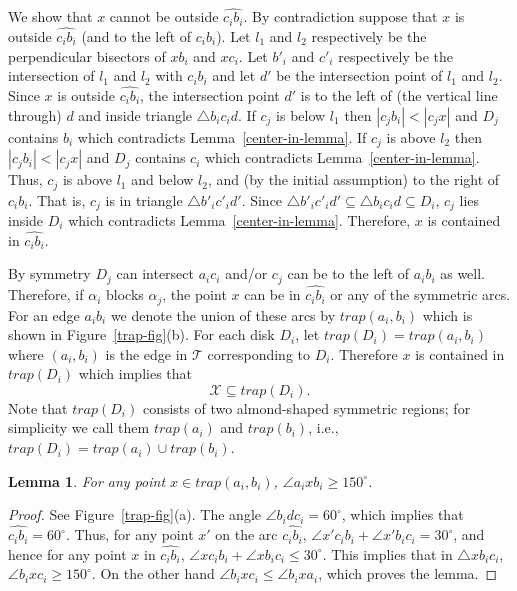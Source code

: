 \documentclass[11pt,a4paper]{article}
\newtheorem{lemma}{Lemma}
\begin{document}
We show that $x$ cannot be outside $\widehat{c_ib_i}$. By contradiction suppose that $x$ is outside $\widehat{c_ib_i}$ (and to the left of $c_ib_i$). Let $l_1$ and $l_2$ respectively be the perpendicular bisectors of $xb_i$ and $xc_i$. Let $b'_i$ and $c'_i$ respectively be the intersection of $l_1$ and $l_2$ with $c_ib_i$ and let $d'$ be the intersection point of $l_1$ and $l_2$. Since $x$ is outside $\widehat{c_ib_i}$, the intersection point $d'$ is to the left of (the vertical line through) $d$ and inside triangle $\bigtriangleup b_ic_id$. If $c_j$ is below $l_1$ then $|c_jb_i|<|c_jx|$ and $D_j$ contains $b_i$ which contradicts Lemma~\ref{center-in-lemma}. If $c_j$ is above $l_2$ then $|c_jb_i|<|c_jx|$ and $D_j$ contains $c_i$ which contradicts Lemma~\ref{center-in-lemma}. Thus, $c_j$ is above $l_1$ and below $l_2$, and (by the initial assumption) to the right of $c_ib_i$. That is, $c_j$ is in triangle $\bigtriangleup b'_ic'_id'$. Since $\bigtriangleup b'_ic'_id'\subseteq \bigtriangleup b_ic_id\subseteq D_i$, $c_j$ lies inside $D_i$ which contradicts Lemma~\ref{center-in-lemma}. Therefore, $x$ is contained in $\widehat{c_ib_i}$. 

By symmetry $D_j$ can intersect $a_ic_i$ and/or $c_j$ can be to the left of $a_ib_i$ as well. Therefore, if $\alpha_i$ blocks $\alpha_j$, the point $x$ can be in $\widehat{c_ib_i}$ or any of the symmetric arcs. For an edge $a_ib_i$ we denote the union of these arcs by $trap(a_i,b_i)$ which is shown in Figure~\ref{trap-fig}(b). For each disk $D_i$, let $trap(D_i)= trap(a_i,b_i)$ where $(a_i, b_i)$ is the edge in $\mathcal{T}$ corresponding to $D_i$. Therefore $x$ is contained in $trap(D_i)$ which implies that $$\mathcal{X}\subseteq trap(D_i).$$ Note that $trap(D_i)$ consists of two almond-shaped symmetric regions; for simplicity we call them $trap(a_i)$ and $trap(b_i)$, i.e., $trap(D_i)=trap(a_i)\cup trap(b_i)$.

\begin{lemma}
\label{angle-in-trap}
 For any point $x\in trap(a_i,b_i)$, $\angle a_ixb_i \ge 150^\circ$.
\end{lemma}
\begin{proof}
 See Figure~\ref{trap-fig}(a). The angle $\angle b_idc_i = 60^\circ$, which implies that $\widehat{c_ib_i}= 60^\circ$. Thus, for any point $x'$ on the arc $\widehat{c_ib_i}$, $\angle x'c_ib_i + \angle x'b_ic_i = 30^\circ$, and hence for any point $x$ in $\widehat{c_ib_i}$, $\angle xc_ib_i + \angle xb_ic_i \le 30^\circ$. This implies that in $\bigtriangleup xb_ic_i$, $\angle b_ixc_i \ge 150^\circ$. On the other hand $\angle b_ixc_i \le \angle b_ixa_i$, which proves the lemma.
\end{proof}
\end{document}
